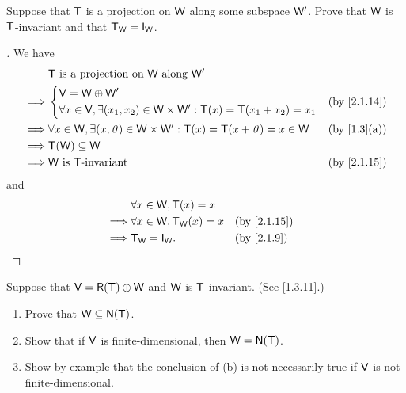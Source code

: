 \begin{ex}\label{ex:2.1.30}
  Suppose that \(\mathsf{T}\) is a projection on \(\mathsf{W}\) along some subspace \(\mathsf{W}'\).
  Prove that \(\mathsf{W}\) is \(\mathsf{T}\)-invariant and that \(\T_{\W} = \IT[\W]\).
\end{ex}

\begin{proof}[]
  We have
  \begin{align*}
             & \T \text{ is a projection on } \W \text{ along } \W'                                                                 \\
    \implies & \begin{dcases}
      \V = \W \oplus \W' \\
      \forall x \in \V, \exists (x_1, x_2) \in \W \times \W' : \T(x) = \T(x_1 + x_2) = x_1
    \end{dcases}                                                           &  & \text{(by \cref{2.1.14})} \\
    \implies & \forall x \in \W, \exists (x, \zv) \in \W \times \W' : \T(x) = \T(x + \zv) = x \in \W &  & \text{(by \cref{1.3}(a))} \\
    \implies & \T(\W) \subseteq \W                                                                                                  \\
    \implies & \W \text{ is } \T\text{-invariant}                                                    &  & \text{(by \cref{2.1.15})}
  \end{align*}
  and
  \begin{align*}
             & \forall x \in \W, \T(x) = x                                     \\
    \implies & \forall x \in \W, \T_{\W}(x) = x &  & \text{(by \cref{2.1.15})} \\
    \implies & \T_{\W} = \IT[\W].               &  & \text{(by \cref{2.1.9})}
  \end{align*}
\end{proof}

\begin{ex}\label{ex:2.1.31}
  Suppose that \(\V = \rg{\T} \oplus \W\) and \(\mathsf{W}\) is \(\mathsf{T}\)-invariant.
  (See \cref{1.3.11}.)
  \begin{enumerate}
    \item Prove that \(\W \subseteq \ns{\T}\).
    \item Show that if \(\mathsf{V}\) is finite-dimensional, then \(\W = \ns{\T}\).
    \item Show by example that the conclusion of (b) is not necessarily true if \(\mathsf{V}\) is not finite-dimensional.
  \end{enumerate}
\end{ex}

